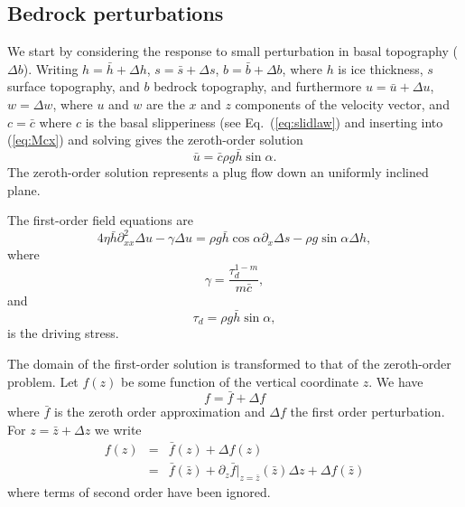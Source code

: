 \documentclass[10pt,a4paper]{book}
\newcommand{\p}{\partial}
\begin{document}
\subsection{Bedrock perturbations}

We start by considering the response to small perturbation in basal
topography ($\Delta b$).  Writing $h=\bar{h}+\Delta h$,
$s=\bar{s}+\Delta s$, $b=\bar{b}+\Delta b$, where $h$ is ice
thickness, $s$ surface topography, and $b$ bedrock topography, and
furthermore $u=\bar{u}+\Delta u$, $w=\Delta w$, where $u$ and $w$ are
the $x$ and $z$ components of the velocity vector, and $c=\bar{c}$
where $c$ is the basal slipperiness (see Eq.~(\ref{eq:slidlaw}) and
inserting into (\ref{eq:Mcx})  and solving gives the
zeroth-order solution
\begin{equation}
\bar{u}=\bar{c} \rho g \bar{h} \sin \alpha  .
\label{eq:zeroth} \end{equation}
The zeroth-order solution represents a plug flow down an uniformly
inclined plane.

The first-order field equations are
\begin{equation}
4 \eta \bar{h} \p^2_{xx} \Delta u  -\gamma \Delta u 
=\rho g \bar{h} \cos \alpha \p_x \Delta s - \rho g \sin \alpha \Delta h,
\label{eq:Mcx1} 
\end{equation}
where
\begin{equation}
\gamma=\frac{\tau_d^{1-m}}{m \bar{c}} ,
\end{equation}
and 
\begin{equation} 
\tau_d=\rho g \bar{h} \sin \alpha,
\end{equation}
is the driving stress. 


The domain of the first-order solution is transformed to that of the
zeroth-order problem. Let $f(z)$ be some function of the vertical
coordinate $z$. We have
\[
f=\bar{f}+\Delta f
\]
where $\bar{f}$ is the zeroth order approximation and $\Delta f$ the
first order perturbation.
For $z=\bar{z}+\Delta z$ we write
\begin{eqnarray*}
f(z)&=&\bar{f}(z)+\Delta f(z) \\
&=& \bar{f}(\bar{z})+  \p_z \bar{f}|_{z=\bar{z}}(\bar{z}) \Delta z + \Delta f(\bar{z}) 
\end{eqnarray*}
where terms of second order have been ignored.
\end{document}
